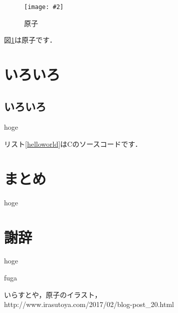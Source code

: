 \documentclass[10pt,a4paper]{jsarticle}
\newcommand{\figuref}[1]{図\ref{#1}}
\newcommand{\fig}[4][width=\textwidth]{
    \begin{figure}[!h]
    \begin{center}
    \texttt{[image: \#2]}
    \caption{#3}
    \label{#4}
    \end{center}
    \end{figure}
}
\newcommand{\lstref}[1]{リスト\ref{#1}}
\begin{document}
\newpage

\fig{image/atom.jpg}{原子}{atom}

\figuref{atom}は原子です\cite{irasutoya}．

\section{いろいろ}

\subsection{いろいろ}
hoge

\lstref{helloworld}はCのソースコードです．

\section{まとめ}
hoge

\section*{謝辞} %
hoge

\begin{flushleft} %
\begin{thebibliography}{9} %

fuga %

いらすとや，原子のイラスト，
\\ %
http://www.irasutoya.com/2017/02/blog-post\_20.html %

\end{thebibliography}
\end{flushleft}
\end{document}

